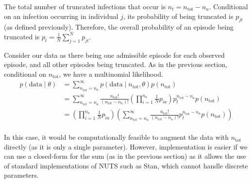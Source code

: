\documentclass[thesis.tex]{subfiles}
\begin{document}
The total number of truncated infections that occur is
$n_t = n_\text{tot} - n_a$. Conditional on an infection occurring in
individual $j$, its probability of being truncated is $p_{jt}$ (as
defined previously). Therefore, the overall probability of an episode
being truncated is $p_t = \frac{1}{N} \sum_{j=1}^N p_{jt}$.

Consider our data as there being one admissible episode for each
observed episode, and all other episodes being truncated. As in the
previous section, conditional on $n_\text{tot}$, we have a multinomial
likelihood.
\begin{align}
p(\text{data} \mid \theta)
&= \sum_{n_\text{tot}=n_a}^\infty p(\text{data} \mid n_\text{tot}, \theta) p(n_\text{tot}) \\
&= \sum_{n_\text{tot}=n_a}^\infty \frac{n_\text{tot}!}{(n_\text{tot}-n_a)!} \left( \prod_{i=1}^{n_a} \frac{1}{N} p_{ia} \right) p_t^{n_\text{tot}-n_a} p(n_\text{tot}) \\
&= \left( \prod_{i=1}^{n_a} \frac{1}{N} p_{ia} \right) \left( \sum_{n_\text{tot}=n_a}^\infty \frac{n_\text{tot}!}{(n_\text{tot}-n_a)!} p_t^{n_\text{tot}-n_a} p(n_\text{tot}) \right) \\
\end{align}

In this case, it would be computationally feasible to augment the data
with $n_\text{tot}$ directly (as it is only a single parameter).
However, implementation is easier if we can use a closed-form for the
sum (as in the previous section) as it allows the use of standard
implementations of NUTS such as Stan, which cannot handle discrete
parameters.
\end{document}
